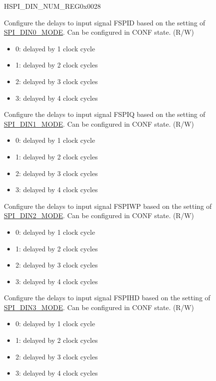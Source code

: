 \begin{register}{H}{SPI\_DIN\_NUM\_REG}{0x0028}\label{regdesc:SPIDINNUMREG}
%
%
%
%
%
\regnewline%
\begin{regdesc}\begin{reglist}
\label{fielddesc:SPIDIN0NUM}\item [SPI\_DIN0\_NUM] Configure the delays to input signal FSPID based on the setting of \hyperref[fielddesc:SPIDIN0MODE]{SPI\_DIN0\_MODE}. Can be configured in CONF state. (R/W)
\begin{itemize}
    \item 0: delayed by 1 clock cycle
    \item 1: delayed by 2 clock cycles
    \item 2: delayed by 3 clock cycles
    \item 3: delayed by 4 clock cycles
\end{itemize}
\label{fielddesc:SPIDIN1NUM}\item [SPI\_DIN1\_NUM] Configure the delays to input signal FSPIQ based on the setting of \hyperref[fielddesc:SPIDIN1MODE]{SPI\_DIN1\_MODE}. Can be configured in CONF state. (R/W)
\begin{itemize}
    \item 0: delayed by 1 clock cycle
    \item 1: delayed by 2 clock cycles
    \item 2: delayed by 3 clock cycles
    \item 3: delayed by 4 clock cycles
\end{itemize}
\label{fielddesc:SPIDIN2NUM}\item [SPI\_DIN2\_NUM] Configure the delays to input signal FSPIWP based on the setting of \hyperref[fielddesc:SPIDIN2MODE]{SPI\_DIN2\_MODE}. Can be configured in CONF state. (R/W)
\begin{itemize}
    \item 0: delayed by 1 clock cycle
    \item 1: delayed by 2 clock cycles
    \item 2: delayed by 3 clock cycles
    \item 3: delayed by 4 clock cycles
\end{itemize}
\label{fielddesc:SPIDIN3NUM}\item [SPI\_DIN3\_NUM] Configure the delays to input signal FSPIHD based on the setting of \hyperref[fielddesc:SPIDIN3MODE]{SPI\_DIN3\_MODE}. Can be configured in CONF state. (R/W)
\begin{itemize}
    \item 0: delayed by 1 clock cycle
    \item 1: delayed by 2 clock cycles
    \item 2: delayed by 3 clock cycles
    \item 3: delayed by 4 clock cycles
\end{itemize}
\end{reglist}\end{regdesc}
\end{register}



